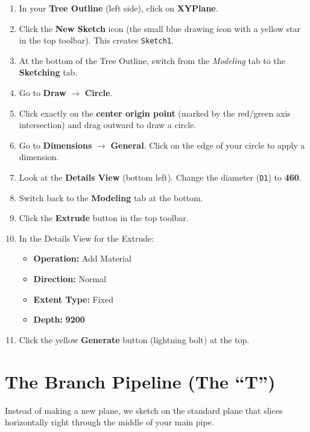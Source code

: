 \documentclass[12pt,a4paper]{report}
\begin{document}
\begin{enumerate}
  \item In your \textbf{Tree Outline} (left side), click on \textbf{XYPlane}.
  \item Click the \textbf{New Sketch} icon (the small blue drawing icon with a yellow star in the top toolbar). This creates \texttt{Sketch1}.
  \item At the bottom of the Tree Outline, switch from the \textit{Modeling} tab to the \textbf{Sketching} tab.
  \item Go to \textbf{Draw} $\rightarrow$ \textbf{Circle}.
  \item Click exactly on the \textbf{center origin point} (marked by the red/green axis intersection) and drag outward to draw a circle.
  \item Go to \textbf{Dimensions} $\rightarrow$ \textbf{General}. Click on the edge of your circle to apply a dimension.
  \item Look at the \textbf{Details View} (bottom left). Change the diameter (\texttt{D1}) to \textbf{460}.
  \item Switch back to the \textbf{Modeling} tab at the bottom.
  \item Click the \textbf{Extrude} button in the top toolbar.
  \item In the Details View for the Extrude:
  \begin{itemize}
    \item \textbf{Operation:} Add Material
    \item \textbf{Direction:} Normal
    \item \textbf{Extent Type:} Fixed
    \item \textbf{Depth:} \textbf{9200}
  \end{itemize}
  \item Click the yellow \textbf{Generate} button (lightning bolt) at the top.
\end{enumerate}

\medskip
\noindent{}


\section{The Branch Pipeline (The ``T'')}

Instead of making a new plane, we sketch on the standard plane that slices horizontally right through the middle of your main pipe.
\end{document}
